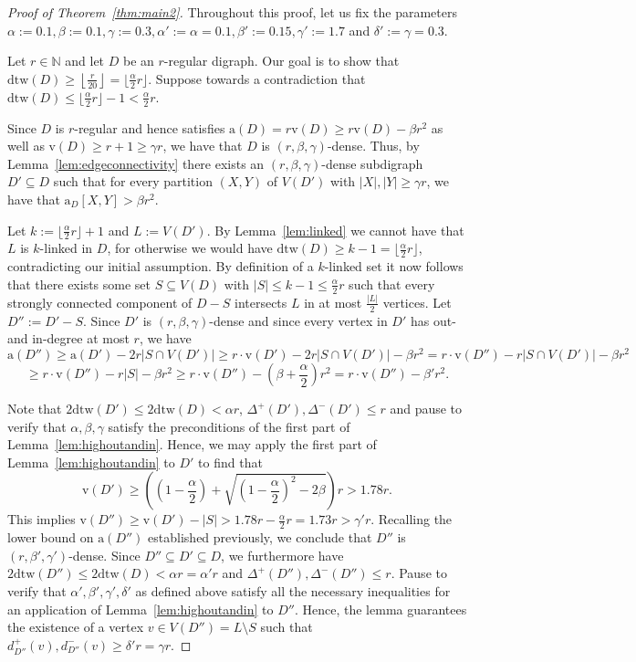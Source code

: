 \documentclass[a4paper,10pt]{article}
\begin{document}
\begin{proof}[Proof of Theorem~\ref{thm:main2}]
Throughout this proof, let us fix the parameters $\alpha:=0.1, \beta:=0.1, \gamma:=0.3, \alpha':=\alpha=0.1, \beta':=0.15, \gamma':=1.7$ and $\delta':=\gamma=0.3$.

Let $r\in \mathbb{N}$ and let $D$ be an $r$-regular digraph. Our goal is to show that $\mathrm{dtw}(D)\ge \left\lfloor\frac{r}{20}\right\rfloor=\lfloor \frac{\alpha}{2}r\rfloor$. Suppose towards a contradiction that $\mathrm{dtw}(D)\le\lfloor \frac{\alpha}{2}r\rfloor-1<\frac{\alpha}{2}r$.

Since $D$ is $r$-regular and hence satisfies $\mathrm{a}(D)=r\mathrm{v}(D)\ge r\mathrm{v}(D)-\beta r^2$ as well as $\mathrm{v}(D)\ge r+1\ge \gamma r$, we have that $D$ is $(r,\beta,\gamma)$-dense. Thus, by Lemma~\ref{lem:edgeconnectivity} there exists an $(r,\beta,\gamma)$-dense subdigraph $D'\subseteq D$ such that for every partition $(X,Y)$ of $V(D')$ with $|X|, |Y|\ge \gamma r$, we have that $\mathrm{a}_D[X,Y]> \beta r^2$.

Let $k:=\lfloor \frac{\alpha}{2}r\rfloor+1$ and $L:=V(D')$. By Lemma~\ref{lem:linked} we cannot have that $L$ is $k$-linked in $D$, for otherwise we would have $\mathrm{dtw}(D)\ge k-1=\lfloor \frac{\alpha}{2}r\rfloor$, contradicting our initial assumption. By definition of a $k$-linked set it now follows that there exists some set $S\subseteq V(D)$ with $|S|\le k-1\le \frac{\alpha}{2}r$ such that every strongly connected component of $D-S$ intersects $L$ in at most $\frac{|L|}{2}$ vertices. Let $D'':=D'-S$. Since $D'$ is $(r,\beta,\gamma)$-dense and since every vertex in $D'$ has out- and in-degree at most $r$, we have $$\mathrm{a}(D'')\ge \mathrm{a}(D')-2r|S\cap V(D')|\ge r\cdot \mathrm{v}(D')-2r|S\cap V(D')|-\beta r^2=r\cdot\mathrm{v}(D'')-r|S\cap V(D')|-\beta r^2$$ $$\ge r\cdot \mathrm{v}(D'')-r|S|-\beta r^2\ge r\cdot \mathrm{v}(D'')-\left(\beta+\frac{\alpha}{2}\right)r^2=r\cdot \mathrm{v}(D'')-\beta'r^2.$$


Note that $2\mathrm{dtw}(D')\le 2\mathrm{dtw}(D)<\alpha r$, $\Delta^+(D'), \Delta^-(D')\le r$  and pause to verify that $\alpha,\beta,\gamma$ satisfy the preconditions of the first part of Lemma~\ref{lem:highoutandin}. Hence, we may apply the first part of Lemma~\ref{lem:highoutandin} to $D'$ to find that $$\mathrm{v}(D')\ge \left(\left(1-\frac{\alpha}{2}\right)+\sqrt{\left(1-\frac{\alpha}{2}\right)^2-2\beta}\right)r>1.78r.$$ This implies $\mathrm{v}(D'')\ge \mathrm{v}(D')-|S|> 1.78r-\frac{\alpha}{2}r=1.73r>\gamma' r$. Recalling the lower bound on $\mathrm{a}(D'')$ established previously, we conclude that $D''$ is $(r,\beta',\gamma')$-dense. Since $D''\subseteq D'\subseteq D$, we furthermore have $2\mathrm{dtw}(D'')\le 2\mathrm{dtw}(D)<\alpha r=\alpha'r$ and $\Delta^+(D''), \Delta^-(D'')\le r$. Pause to verify that $\alpha',\beta',\gamma',\delta'$ as defined above satisfy all the necessary inequalities for an application of Lemma~\ref{lem:highoutandin} to $D''$. Hence, the lemma guarantees the existence of a vertex $v\in V(D'')=L\setminus S$ such that $d_{D''}^+(v), d_{D''}^-(v)\ge \delta' r=\gamma r$.


\end{proof}
\end{document}
